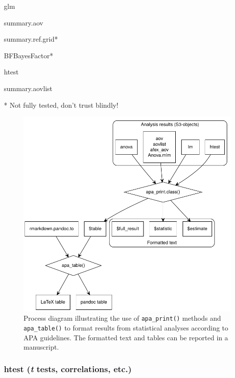 \documentclass[man,floatsintext]{apa6}
\theoremstyle{definition}
\theoremstyle{definition}
\theoremstyle{definition}
\theoremstyle{remark}
\begin{document}
glm

summary.aov

summary.ref.grid*

BFBayesFactor*

htest

summary.aovlist

{* Not fully tested, don't trust blindly!}






\begin{figure}

{\centering \includegraphics{paper_files/figure-latex/formatting-process-diagram} 

}

\caption{Process diagram illustrating the use of
\texttt{apa\_print()} methods and \texttt{apa\_table()} to format
results from statistical analyses according to APA guidelines. The
formatted text and tables can be reported in a manuscript.}\label{fig:formatting-process-diagram}
\end{figure}

\subsubsection{\texorpdfstring{htest (\emph{t} tests, correlations,
etc.)}{htest (t tests, correlations, etc.)}}\label{htest-t-tests-correlations-etc.}
\end{document}
